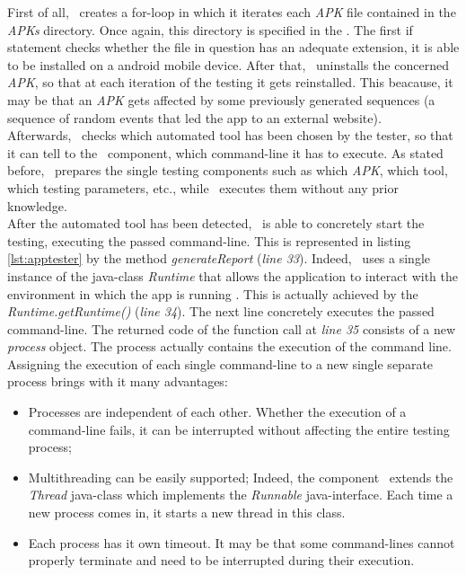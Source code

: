 First of all, \AppTester\ creates a for-loop in which it iterates each \textit{APK} file contained in the \textit{APKs} directory. Once again, this directory is specified in the \Config. 
The first if statement checks whether the file in question has an adequate extension, \ie it is able to be installed on a android mobile device. 
After that, \AppTester\ uninstalls the concerned \textit{APK}, so that at each iteration of the testing it gets reinstalled. 
This beacause, it may be that an \textit{APK} gets affected by some previously generated sequences (\eg a sequence of random events that led the app to an external website). \\
Afterwards, \AppTester\ checks which automated tool has been chosen by the tester, so that it can tell to the \Cmd\ component, which command-line it has to execute. As stated before, \AppTester\ prepares the single testing components such as which \textit{APK}, which tool, which testing parameters, etc., while \Cmd\ executes them without any prior knowledge. \\
After the automated tool has been detected, \Cmd\ is able to concretely start the testing, executing the passed command-line. This is represented in listing \ref{lst:apptester} by the method \textit{generateReport} (\textit{line 33}). Indeed, \Cmd\ uses a single instance of the java-class \textit{Runtime} that allows the application to interact with the environment in which the app is running \cite{runtime}. 
This is actually achieved by the \textit{Runtime.getRuntime()} (\textit{line 34}). The next line concretely executes the passed command-line. 
The returned code of the function call at \textit{line 35} consists of a new \textit{process} object. 
The process actually contains the execution of the command line. 
Assigning the execution of each single command-line to a new single separate process brings with it many advantages: 
\begin{itemize}
\item Processes are independent of each other. 
Whether the execution of a command-line fails, it can be interrupted without affecting the entire testing process; 
\item Multithreading can be easily supported; Indeed, the component \Stream\ extends the \textit{Thread} java-class which implements the \textit{Runnable} java-interface. Each time a new process comes in, it starts a new thread in this class.
\item Each process has it own timeout. It may be that some command-lines cannot properly terminate and need to be interrupted during their execution.  
\end{itemize}
